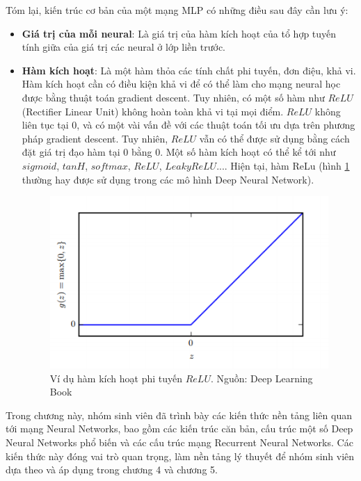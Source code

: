 Tóm lại, kiến trúc cơ bản của một mạng MLP có những điều sau đây cần lưu ý:
\begin{itemize}
\item \textbf{Giá trị của mỗi neural}: Là giá trị của hàm kích hoạt của tổ hợp tuyến tính giữa của giá trị các neural ở lớp liền trước.
\item \textbf{Hàm kích hoạt}: Là một hàm thỏa các tính chất phi tuyến, đơn điệu, khả vi. Hàm kích hoạt cần có điều kiện khả vi để có thể làm cho mạng neural học được bằng thuật toán gradient descent. Tuy nhiên, có một số hàm như $ReLU$ (Rectifier Linear Unit) không hoàn toàn khả vi tại mọi điểm. $ReLU$ không liên tục tại 0, và có một vài vấn đề với các thuật toán tối ưu dựa trên phương pháp gradient descent. Tuy nhiên, $ReLU$ vẫn có thể được sử dụng bằng cách đặt giá trị đạo hàm tại 0 bằng 0. Một số hàm kích hoạt có thể kể tới như $sigmoid$, $tanH$, $softmax$, $ReLU$, $ Leaky ReLU$.... Hiện tại, hàm ReLu (hình \ref{fig:relu} thường hay được sử dụng trong các mô hình Deep Neural Network).

\begin{figure}[htp]
\centering
\includegraphics[]{resources/chapter2_relu.png}
\caption[Ví dụ hàm kích hoạt phi tuyến $ReLU$]{Ví dụ hàm kích hoạt phi tuyến $ReLU$. \footnotesize{Nguồn: Deep Learning Book \cite{Goodfellow-et-al-2016}}}
\label{fig:relu}
\end{figure}

\end{itemize}




\begin{ChapAbstract}
Trong chương này, nhóm sinh viên đã trình bày các kiến thức nền tảng liên quan tới mạng Neural Networks, bao gồm các kiến trúc căn bản, cấu trúc một số Deep Neural Networks phổ biến và các cấu trúc mạng Recurrent Neural Networks. Các kiến thức này đóng vai trò quan trọng, làm nền tảng lý thuyết để nhóm sinh viên dựa theo và áp dụng trong chương 4 và chương 5.
\end{ChapAbstract}
